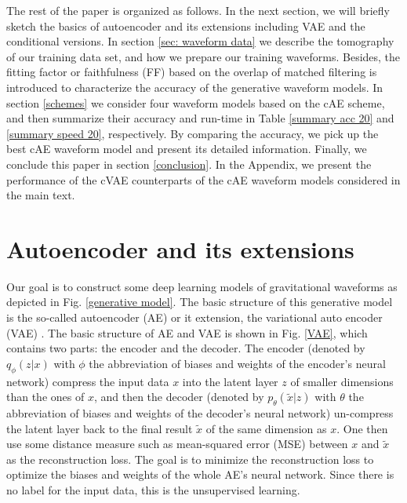 \documentclass[twocolumn,prd,superscriptaddress,nofootinbib]{revtex4-1}
\begin{document}
The rest of the paper is organized as follows.  In the next section, we will briefly sketch the basics of autoencoder and its extensions including VAE and the conditional versions. In section \ref{sec: waveform data} we describe the tomography of our training data set, and how we prepare our training waveforms. Besides, the fitting factor or faithfulness (FF) based on the overlap of matched filtering is introduced to characterize the accuracy of the generative waveform models. In section \ref{schemes} we consider four waveform models based on the cAE scheme, and then summarize their accuracy and run-time in Table \ref{summary acc 20} and \ref{summary speed 20}, respectively. By comparing the accuracy, we pick up the best cAE waveform model and present its detailed information.  Finally, we conclude this paper in section \ref{conclusion}. In the Appendix, we present the performance of the cVAE counterparts of the cAE waveform models considered in the main text. 


\section{Autoencoder and its extensions}\label{section:cVAE}

Our goal is to construct some deep learning models of gravitational waveforms as depicted in Fig. \ref{generative model}. The basic structure of this generative model is the so-called autoencoder (AE) \cite{10.5555/2987189.2987190} or it extension, the variational auto encoder (VAE) \cite{kingma2019introduction,yu2020tutorial}. The basic structure of AE and VAE is shown in Fig. \ref{VAE}, which contains two parts: the encoder and the decoder. The encoder (denoted by $q_{\phi}(z|x)$ with $\phi$ the abbreviation of biases and weights of the encoder's neural network) compress the input data $x$ into the latent layer $z$ of smaller dimensions than the ones of $x$, and then the decoder (denoted by $p_{\theta}(\tilde{x}|z)$ with $\theta$ the abbreviation of biases and weights of the decoder's neural network) un-compress the latent layer back to the final result $\tilde{x}$ of the same dimension as $x$. One then use some distance measure such as mean-squared error (MSE) between $x$ and $\tilde{x}$ as the reconstruction loss. The goal is to minimize the reconstruction loss to optimize the biases and weights of the whole AE's neural network. Since there is no label for the input data, this is the unsupervised learning. 
\end{document}
